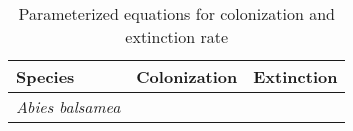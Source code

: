 \begin{table}[tb]
\label{tab:parameterized_equations}
\caption{Parameterized equations for colonization and extinction rate}
\begin{tabular}{lll}
\toprule
Species    & Colonization & Extinction  \\ \midrule
{\it Abies balsamea} & & \\ 
\bottomrule
\end{tabular}
\end{table}